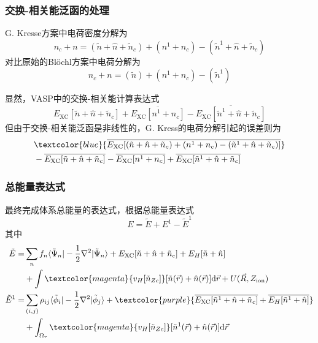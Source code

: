 \frame
{
\frametitle{交换-相关能泛函的处理}
\textrm{G. Kresse}方案中电荷密度分解为
\begin{displaymath}
	n_c+n=(\tilde n+\hat n+\tilde n_c)+(n^1+n_c)-(\tilde n^1+\hat n+\tilde n_c)
\end{displaymath}
对比原始的\textrm{Bl\"ochl}方案中电荷分解为
\begin{displaymath}
	n_c+n=(\tilde n)+(n^1+n_c)-(\tilde n^1)
\end{displaymath}

显然，\textrm{VASP}中的交换-相关能计算表达式
\begin{displaymath}
	E_{\mathrm{XC}}[\tilde n+\hat n+\tilde n_c]+\overline{E_{\mathrm{XC}}[n^1+n_c]}-\overline{E_{\mathrm{XC}}[\tilde n^1+\hat n+\tilde n_c]}
\end{displaymath}
但由于交换-相关能泛函是非线性的，\textrm{G. Kress}的电荷分解引起的误差则为
\begin{displaymath}
	\begin{aligned}
		&\textcolor{blue}{\overline{E_{\mathrm{XC}}[(\tilde n+\hat n+\tilde n_c)+(n^1+n_c)-(\tilde n^1+\hat n+\tilde n_c)]}}\\
		&-\overline{E_{\mathrm{XC}}[\tilde n+\hat n+\tilde n_c]}-\overline{E_{\mathrm{XC}}[n^1+n_c]}+\overline{E_{\mathrm{XC}}[\tilde n^1+\hat n+\tilde n_c]}
	\end{aligned}
\end{displaymath}
}

\frame
{
	\frametitle{总能量表达式}
	最终完成体系总能量的表达式，根据总能量表达式$$E=\tilde E+E^1-\tilde E^1$$其中
	\begin{displaymath}
		\begin{aligned}
			\tilde E=&\sum_nf_n\langle\tilde\Psi_n|-\frac12\nabla^2|\tilde\Psi_n\rangle+E_{\mathrm{XC}}[\tilde n+\hat n+\tilde n_c]+E_H[\tilde n+\hat n]\\
			&+\int \textcolor{magenta}{v_H[\tilde n_{Zc}]}[\tilde n(\vec r)+\hat n(\vec r)]\mathrm{d}\vec r+U(\vec R,Z_{\mathrm{ion}})\\
			\tilde E^1=&\sum_{(i,j)}\rho_{ij}\langle\tilde\phi_i|-\frac12\nabla^2|\tilde\phi_j\rangle+\textcolor{purple}{\overline{E_{\mathrm{XC}}[\tilde n^1+\hat n+\tilde n_c]}+\overline{E_H[\tilde n^1+\hat n]}}\\
			&+\int_{\Omega_r}\textcolor{magenta}{v_H[\tilde n_{Zc}]}[\tilde n^1(\vec r)+\hat n(\vec r)]\mathrm{d}\vec r
		\end{aligned}
	\end{displaymath}
}

